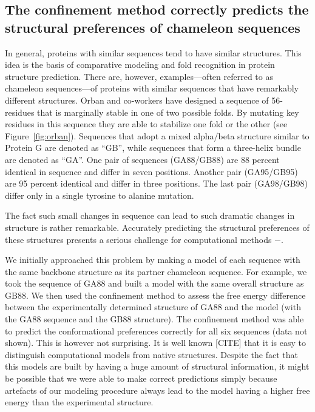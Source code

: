 \documentclass[12pt]{article}
\begin{document}
\subsection{The confinement method correctly predicts the structural preferences of chameleon
sequences}

In general, proteins with similar sequences tend to have similar structures. This idea is the basis
of comparative modeling and fold recognition in protein structure prediction. There are, however,
examples---often referred to as chameleon sequences---of proteins with similar sequences that have
remarkably different structures. Orban and co-workers have designed a sequence of 56-residues that
is marginally stable in one of two possible folds. By mutating key residues in this sequence they
are able to stabilize one fold or the other (see Figure~\ref{fig:orban}). Sequences that adopt a mixed alpha/beta structure similar to Protein G
are denoted as ``GB'', while sequences that form a three-helix bundle are denoted as ``GA''. One
pair of sequences (GA88/GB88) are 88 percent identical in sequence and differ in seven positions. Another pair
(GA95/GB95) are 95 percent identical and differ in three positions. The last pair (GA98/GB98) differ
only in a single tyrosine to alanine mutation.

The fact such small changes in sequence can lead to such dramatic changes in structure is rather
remarkable. Accurately predicting the structural preferences of these structures presents a serious
challenge for computational methods \cite{Alexander2007}$-$\cite{Shortle20009}.

We initially approached this problem by making a model of each sequence with the same backbone
structure as its partner chameleon sequence. For example, we took the sequence of GA88 and built a
model with the same overall structure as GB88. We then used the confinement method to assess the
free energy difference between the experimentally determined structure of GA88 and the model (with
the GA88 sequence and the GB88 structure). The confinement method was able to predict the
conformational preferences correctly for all six sequences (data not shown). This is however not
surprising. It is well known [CITE] that it is easy to distinguish computational models from native
structures. Despite the fact that this models are built by having a huge amount of structural
information, it might be possible that we were able to make correct predictions simply
because artefacts of our modeling procedure always lead to the model having a higher free energy
than the experimental structure. 
\end{document}
